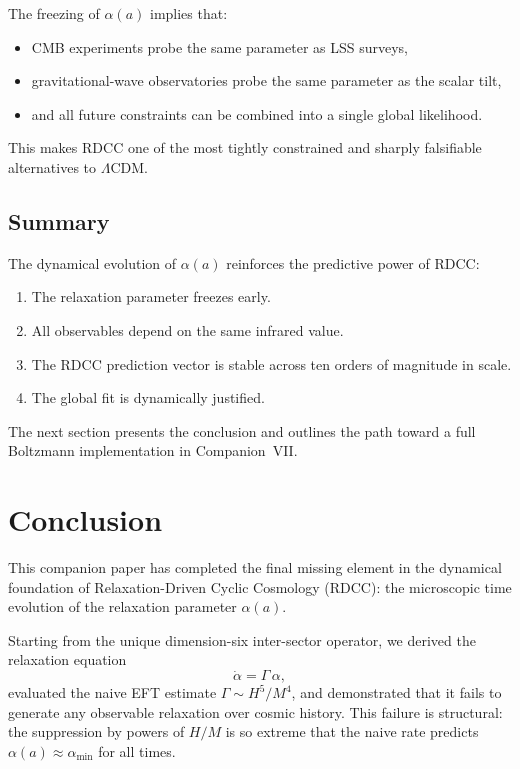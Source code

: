 \documentclass[11pt,a4paper]{article}
\begin{document}
The freezing of $\alpha(a)$ implies that:
\begin{itemize}
    \item CMB experiments probe the same parameter as LSS surveys,
    \item gravitational-wave observatories probe the same parameter as the scalar tilt,
    \item and all future constraints can be combined into a single global likelihood.
\end{itemize}
This makes RDCC one of the most tightly constrained and sharply falsifiable alternatives to
$\Lambda$CDM.

\subsection{Summary}

The dynamical evolution of $\alpha(a)$ reinforces the predictive power of RDCC:
\begin{enumerate}
    \item The relaxation parameter freezes early.
    \item All observables depend on the same infrared value.
    \item The RDCC prediction vector is stable across ten orders of magnitude in scale.
    \item The global fit is dynamically justified.
\end{enumerate}

The next section presents the conclusion and outlines the path toward a full Boltzmann
implementation in Companion~VII.

\section{Conclusion}

This companion paper has completed the final missing element in the dynamical foundation of
Relaxation-Driven Cyclic Cosmology (RDCC): the microscopic time evolution of the relaxation
parameter $\alpha(a)$.

Starting from the unique dimension-six inter-sector operator, we derived the relaxation equation
\begin{equation}
    \dot{\alpha} = \Gamma\,\alpha,
\end{equation}
evaluated the naive EFT estimate $\Gamma \sim H^5/M^4$, and demonstrated that it fails to
generate any observable relaxation over cosmic history. This failure is structural: the suppression
by powers of $H/M$ is so extreme that the naive rate predicts $\alpha(a) \approx \alpha_{\min}$
for all times.
\end{document}
